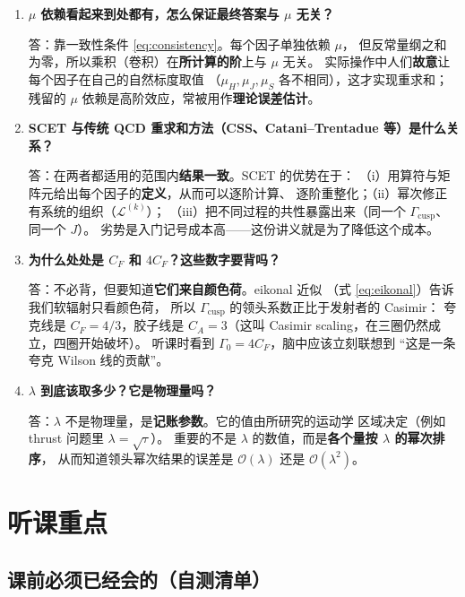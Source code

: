 \documentclass[UTF8,a4paper,11pt]{ctexart}
\theoremstyle{definition}
\theoremstyle{remark}
\theoremstyle{plain}
\newcommand{\CF}{C_F}
\newcommand{\CA}{C_A}
\newcommand{\Gcusp}{\Gamma_{\mathrm{cusp}}}
\newcommand{\en}[1]{\textsf{#1}}   %
\begin{document}
\begin{enumerate}[label=\textbf{Q\arabic*.}, leftmargin=1.3cm]
\item \textbf{$\mu$ 依赖看起来到处都有，怎么保证最终答案与 $\mu$ 无关？}

答：靠一致性条件 \eqref{eq:consistency}。每个因子单独依赖 $\mu$，
但反常量纲之和为零，所以乘积（卷积）在\textbf{所计算的阶}上与 $\mu$ 无关。
实际操作中人们\textbf{故意}让每个因子在自己的自然标度取值
（$\mu_H,\mu_J,\mu_S$ 各不相同），这才实现重求和；
残留的 $\mu$ 依赖是高阶效应，常被用作\textbf{理论误差估计}。

\item \textbf{SCET 与传统 QCD 重求和方法（CSS、Catani--Trentadue 等）是什么关系？}

答：在两者都适用的范围内\textbf{结果一致}。SCET 的优势在于：
（i）用算符与矩阵元给出每个因子的\textbf{定义}，从而可以逐阶计算、
逐阶重整化；（ii）幂次修正有系统的组织（$\mathcal L^{(k)}$）；
（iii）把不同过程的共性暴露出来（同一个 $\Gcusp$、同一个 $J$）。
劣势是入门记号成本高——这份讲义就是为了降低这个成本。

\item \textbf{为什么处处是 $\CF$ 和 $4\CF$？这些数字要背吗？}

答：不必背，但要知道\textbf{它们来自颜色荷}。eikonal 近似
（式 \eqref{eq:eikonal}）告诉我们软辐射只看颜色荷，
所以 $\Gcusp$ 的领头系数正比于发射者的 Casimir：
夸克线是 $\CF=4/3$，胶子线是 $\CA=3$（这叫
\en{Casimir scaling}，在三圈仍然成立，四圈开始破坏）。
听课时看到 $\Gamma_0=4\CF$，脑中应该立刻联想到
“这是一条夸克 Wilson 线的贡献”。

\item \textbf{$\lambda$ 到底该取多少？它是物理量吗？}

答：$\lambda$ 不是物理量，是\textbf{记账参数}。它的值由所研究的运动学
区域决定（例如 thrust 问题里 $\lambda=\sqrt\tau$）。
重要的不是 $\lambda$ 的数值，而是\textbf{各个量按 $\lambda$ 的幂次排序}，
从而知道领头幂次结果的误差是 $\mathcal O(\lambda)$ 还是 $\mathcal O(\lambda^2)$。

\end{enumerate}

\section{听课重点}
\label{sec:focus}

\subsection{课前必须已经会的（自测清单）}
\end{document}

